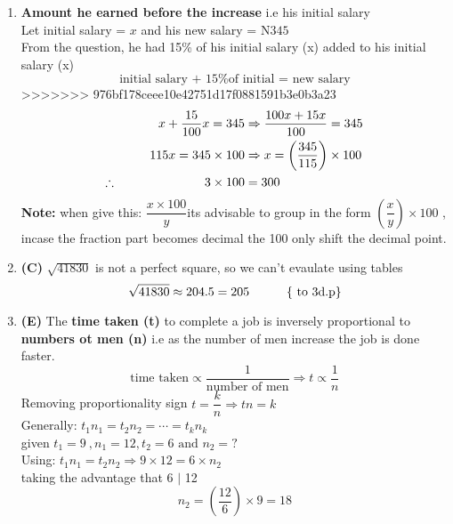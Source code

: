 \begin{multicols}{2}
\begin{enumerate}[label={\textbf{\arabic*.}}]
\begin{enumerate}[label={\arabic*.}]
    \item \textbf{Amount he earned before the increase} i.e his initial salary \\
    Let initial salary = \(x\) and his new salary = N\(345\)\\
    From the question, he had 15\% of his initial salary (x) added to his initial salary (x)
    \[\text{initial salary + 15\% of initial = new salary}\]
>>>>>>> 976bf178ceee10e42751d17f0881591b3e0b3a23
    \begin{align*}
    x + \dfrac{15}{100}x = 345 &\Rightarrow \dfrac{100x + 15x}{100} = 345 \\
    115x = 345 \times 100 &\Rightarrow x = \left(\frac{345}{115}\right) \times 100 \\
    \therefore \hspace{70px} 3 \times 100 &= 300 \\
    \end{align*}
    \textbf{Note:} when give this: \( \dfrac{x \times 100}{y}\)its advisable to group in the form
    \(\left(\dfrac{x}{y}\right) \times 100\) , incase the fraction part becomes decimal the 100 only shift the
    decimal point. 

    \item \textbf{(C) } $ \sqrt{41830}$ is not a perfect square, so we can't evaulate using tables
    \[ \sqrt{41830} \approx 204.5 = 205 \hspace{30px} \text{\{ to 3d.p\}}\]
    \item \textbf{(E)} The \textbf{time taken (t)} to complete a job is inversely proportional to \textbf{numbers ot men (n)} 
    i.e as the number of men increase the job is done faster. 
        \begin{equation}
            \text{time taken} \propto \dfrac{1}{\text{number of men}} \Rightarrow t \propto \dfrac{1}{n} 
        \end{equation}
    Removing proportionality sign
    \(t = \dfrac{k}{n} \Rightarrow tn = k\) \\
    Generally:  \hspace{10px}\(t_{1}n_{1} = t_{2}n_2 = \cdots = t_{k}n_{k}\)\\
    given \(t_{1} = 9\ , n_{1} = 12 , t_{2} = 6 \text{ and } n_{2} = ?\) \\
    Using: \(t_{1}n_{1} = t_{2}n_{2} \Rightarrow 9 \times 12 = 6 \times n_{2}\) \\
    taking the advantage that 6 $\mid$ 12 
    \[n_{2} = \left(\frac{12}{6}\right) \times 9 = 18\]


\end{enumerate}
\end{enumerate}
\end{multicols}

